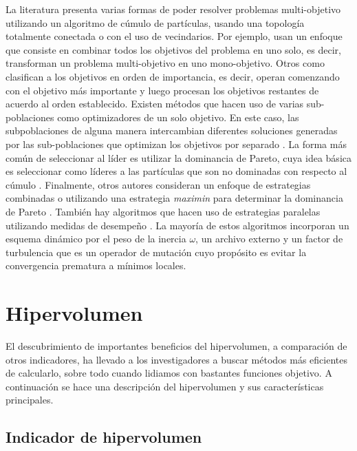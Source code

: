   La literatura presenta varias formas de poder resolver problemas multi-objetivo utilizando un algoritmo de c\'umulo de part\'iculas, 
  usando una topolog\'ia totalmente conectada o con el uso de vecindarios. Por ejemplo, \cite{Parsopoulos02particleswarm} usan un enfoque
  que consiste en combinar todos los objetivos del problema en uno solo, es decir, transforman un problema multi-objetivo en uno mono-objetivo. 
  Otros
  como \cite{Hu02multiobjectiveoptimization, Hu03particleswarm} clasifican a los objetivos en orden de importancia, es decir, operan 
  comenzando con el objetivo m\'as importante y luego procesan los objetivos restantes de acuerdo al orden establecido. 
  Existen m\'etodos que hacen uso de varias sub-poblaciones como optimizadores de un solo objetivo. En este caso, las subpoblaciones 
  de alguna 
  manera intercambian diferentes soluciones generadas por las sub-poblaciones que optimizan los objetivos por separado \cite{Mostaghim04coveringpareto-optimal, MartinezC11}.
  La forma m\'as com\'un de seleccionar al l\'ider es utilizar la dominancia de Pareto, cuya idea b\'asica es seleccionar como 
  l\'ideres a las part\'iculas que son no dominadas con respecto al c\'umulo \cite{Coello04, Salazar05a}. Finalmente, otros 
  autores consideran un enfoque de estrategias combinadas o utilizando una estrategia \textit{maximin} para determinar la dominancia de Pareto 
  \cite{Mostaghim7, FuJZ11}. Tambi\'en hay algoritmos que hacen uso de estrategias paralelas utilizando medidas de desempe\~no \cite{Parallel}. 
  La mayor\'ia de estos algoritmos incorporan un esquema din\'amico por el peso de la inercia $\omega$, un archivo externo y un 
  factor de turbulencia que es un operador de mutaci\'on cuyo prop\'osito es evitar la convergencia prematura a m\'inimos locales.

\section{Hipervolumen}

   El descubrimiento de importantes beneficios del hipervolumen, a comparaci\'on de otros indicadores, ha llevado a los investigadores
   a buscar m\'etodos m\'as eficientes de calcularlo, sobre todo cuando lidiamos con bastantes funciones objetivo.
   A continuaci\'on se hace una descripci\'on del hipervolumen y sus caracter\'isticas principales.

  \subsection{Indicador de hipervolumen}

